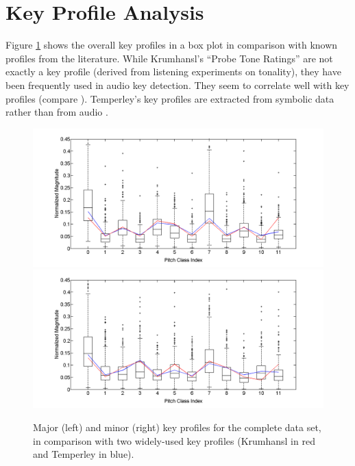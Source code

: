 \documentclass{article}
\begin{document}
\section{Key Profile Analysis}\label{keyprof}
Figure \ref{fig:OverallKeyProfiles} shows the overall key profiles in a box plot in comparison with known profiles from the literature. 
While Krum\-hansl's ``Probe Tone Ratings'' \cite{krumhansl_cognitive_1990} are not exactly a key profile (derived from listening experiments on tonality), they have been frequently used in audio key detection. They seem to correlate well with key profiles (compare \cite{izmirli_template_2005}). 
Temperley's key profiles are extracted from symbolic data  rather than from audio \cite{temperley_bayesian_2004,temperley_pitch-class_2008}.
\begin{figure}[htb]
\centering
    \includegraphics[scale=.2]{graph/allMajChroma+Krum+Temp}
    \includegraphics[scale=.2]{graph/allMinChroma+Krum+Temp}
	\caption{Major (left) and minor (right) key profiles for the complete data set, in comparison with two widely-used key profiles (Krumhansl in red and Temperley in blue).}
	\label{fig:OverallKeyProfiles}
\end{figure}
\end{document}
